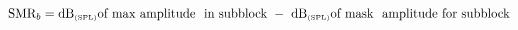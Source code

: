 \documentclass{article}
\begin{document}
 
\[
\mbox{SMR}_b = \mbox{dB}_{\mbox{\tiny (SPL)}} \mbox{of max amplitude \
   in subblock} \ - \ \mbox{dB}_{\mbox{\tiny (SPL)}} \mbox{of mask \
   amplitude for subblock}
\]
 \newpage 
\end{document}
